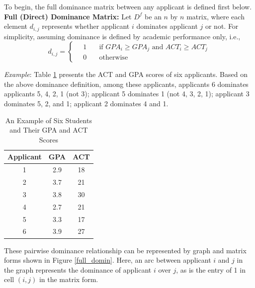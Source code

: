 \documentclass[12pt,english]{report}
\begin{document}
To begin, the full dominance matrix between any applicant is defined first
below.
\textbf{Full (Direct) Dominance Matrix:} Let $D^{f}$ be an $n$ by $n$ matrix,
where each element $d_{i,j}$ represents whether applicant $i$ dominates
applicant $j$ or not. For simplicity, assuming dominance is defined by academic
performance only, i.e.,
\begin{equation}
   d_{i,j} =
  \begin{cases}
\quad   1   & \quad \mbox{if }  GPA_i \geq GPA_j \mbox{ and }  ACT_i \geq ACT_j
\\
  \quad   0  & \quad \mbox{otherwise}
  \end{cases}	
\end{equation}

\noindent \textit{Example}:  Table \ref{student_sample} presents the ACT and
GPA scores of six applicants.  Based on the above dominance definition, among
these applicants,  applicants 6 dominates applicants 5, 4, 2, 1 (not 3);
applicant 5 dominates 1 (not 4, 3, 2, 1); applicant 3 dominates 5, 2, and 1;
applicant 2 dominates 4 and 1.
\begin{table}[ht!]
\centering
\begin{tabular}{|c|c|c|}
\hline
  Applicant & GPA & ACT \\ [0.5ex] 
\hline
1 & 2.9 & 18 \\ \hline
2 & 3.7 & 21 \\ \hline
3 & 3.8 & 30 \\ \hline
4 & 2.7 & 21 \\ \hline
5 & 3.3 & 17 \\ \hline
6 & 3.9 & 27 \\ \hline
\end{tabular}
\caption{An Example of Six Students and Their GPA and ACT Scores} 
\label{student_sample}
\end{table}

These pairwise dominance relationship can be represented by graph and matrix
forms shown in Figure \ref{full_domin}. Here, an arc between applicant $i$ and
$j$ in the graph represents the dominance of applicant $i$ over $j$,  as is the
entry of 1 in cell $(i,j)$ in the matrix form.
\end{document}
